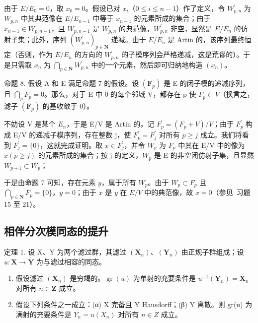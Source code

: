 	由于 \(E/E_{0}=0\)，取 \(x_{0}=0\)。假设已对 \(x_{i}\)（\(0\leqslant i\leqslant n-1\)）作了定义，令 \(W_{p,n}^{\prime}\) 为 \(W_{p,n}\) 中其典范像在 \(E/E_{n-1}\) 中等于 \(x_{n-1}\) 的元素所成的集合；由于 \(x_{n-1}\in W_{p,n-1}\)，且 \(W_{p,n-1}\) 是 \(W_{p,n}\) 的典范像，\(W_{p,n}^{\prime}\) 非空，显然是 \(E/E_{n}\) 的仿射子集；此外，序列 \((W_{p,n}^{\prime})_{p\in\mathbf{N}}\) 递减。由于 \(E/E_{n}\) 是 Artin 的，该序列最终恒定（否则，作为 \(E/E_{n}\) 的方向的 \(W_{p,n}^{\prime}\) 的子模序列会严格递减，这是荒谬的）。于是只需取 \(x_{n}\) 为 \(\bigcap_{p\in\mathbf{N}}W_{p,n}^{\prime}\) 中的一个元素，然后即可归纳地构造 \((x_{n})\)。

命题 8. 假设 A 和 E 满足命题 7 的假设。设 \((\mathbf{F}_{p})\) 是 E 的闭子模的递减序列，且 \(\bigcap_{p} F_{p} = 0\)。那么，对于 E 中 0 的每个邻域 V，都存在 p 使 \(F_{p} \subset V\)（换言之，滤子 \((\mathbf{F}_{p})\) 的基收敛于 0）。

	不妨设 V 是某个 \(E_{n}\)，于是 E/V 是 Artin 的。记 \(F_{p}^{\prime} = (F_{p} + V)/V\)；由于 \(F_{p}^{\prime}\) 构成 E/V 的递减子模序列，存在整数 j，使 \(F_{p}^{\prime} = F_{j}^{\prime}\) 对所有 \(p \geqslant j\) 成立。我们将看到 \(F_{j}^{\prime} = \{0\}\)，这就完成证明。取 \(x \in F_{j}^{\prime}\)，并令 \(W_{p}\) 为 \(F_{p}\) 中其在 E/V 中的像为 \(x (p \geqslant j)\) 的元素所成的集合；按 j 的定义，\(W_{p}\) 是 E 的非空闭仿射子集，且显然 \(W_{p+1} \subset W_{p}\)；

于是由命题 7 可知，存在元素 \(y\)，属于所有 \(W_p\)。由于 \(W_p \subset F_p\) 且 \(\bigcap_{p \in \mathbf{N}} F_p = \{0\}\)，\(y = 0\)；由于 \(x\) 是 \(y\) 在 \(E / V\) 中的典范像，故 \(x = 0\)（参见~习题 15 至 21）。

\subsection{相伴分次模同态的提升}

定理 1. 设 X、Y 为两个滤过群，其滤过 \((\mathbf{X}_n)\)、\((\mathbf{Y}_n)\) 由正规子群组成；设 \(u: \mathbf{X} \to \mathbf{Y}\) 为与滤过相容的同态。

\begin{enumerate}
\def\labelenumi{(\roman{enumi})}
\item
	假设滤过 \((\mathbf{X}_n)\) 是穷竭的。\(\operatorname{gr}(u)\) 为单射的充要条件是 \(u^{-1}(\mathbf{Y}_n) = \mathbf{X}_n\) 对所有 \(n \in \mathbf{Z}\) 成立。
\item
	假设下列条件之一成立：(α) X 完备且 Y Hausdorff；(β) Y 离散。则 gr(u) 为满射的充要条件是 \(Y_{n} = u(X_{n})\) 对所有 \(n \in Z\) 成立。
\end{enumerate}

